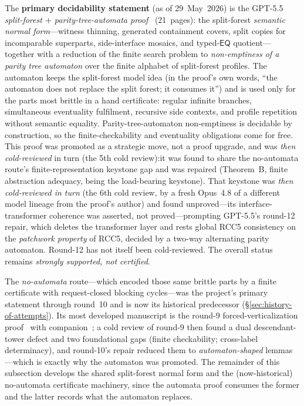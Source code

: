 \documentclass[
]{ceurart}
\theoremstyle{definition}
\newcommand{\EQ}{\ensuremath{\mathsf{EQ}}}
\begin{document}
The \textbf{primary decidability statement} (as of 29~May~2026) is
the GPT-5.5 \emph{split-forest $+$ parity-tree-automata
proof}~\cite{GPT55AutomataRoute} (21~pages): the split-forest
\emph{semantic normal form}---witness thinning, generated
containment covers, split copies for incomparable superparts,
side-interface mosaics, and typed-$\EQ$ quotient---together with a
reduction of the finite search problem to \emph{non-emptiness of a
parity tree automaton} over the finite alphabet of split-forest
profiles.  The automaton keeps the split-forest model idea (in the
proof's own words, ``the automaton does not replace the split
forest; it consumes it'') and is used only for the parts most
brittle in a hand certificate: regular infinite branches,
simultaneous eventuality fulfilment, recursive side contexts, and
profile repetition without semantic equality.  Parity-tree-automaton
non-emptiness is decidable by construction, so the finite-checkability
and eventuality obligations come for free.  This proof was promoted as a strategic
move, not a proof upgrade, and was \emph{then cold-reviewed} in turn
(the 5th cold review):\@ it was found to share the no-automata route's
finite-representation keystone gap and was repaired (Theorem~B, finite
abstraction adequacy, being the load-bearing keystone).  That keystone
was \emph{then cold-reviewed in turn} (the 6th cold review, by a fresh
Opus~4.8 of a different model lineage from the proof's author) and
found unproved---its interface-transformer coherence was asserted, not
proved---prompting GPT-5.5's round-12 repair, which deletes the
transformer layer and rests global RCC5 consistency on the
\emph{patchwork property} of RCC5, decided by a two-way alternating
parity automaton.  Round-12 has not itself been cold-reviewed.  The
overall status remains \emph{strongly supported, not certified}.

The \emph{no-automata} route---which encoded those same brittle
parts by a finite certificate with request-closed blocking
cycles---was the project's primary statement through round~10 and is
now its historical predecessor (\S\ref{sec:history-of-attempts}).
Its most developed manuscript is the round-9 forced-verticalization
proof~\cite{GPT55Round9Sketch} with companion~\cite{GPT55Round9Expanded};
a cold review of round-9 then found a dual descendant-tower defect
and two foundational gaps (finite checkability; cross-label
determinacy), and round-10's repair reduced them to
\emph{automaton-shaped} lemmas---which is exactly why the automaton
was promoted.  The remainder of this subsection develops the shared
split-forest normal form and the (now-historical) no-automata
certificate machinery, since the automata proof consumes the former
and the latter records what the automaton replaces.
\end{document}
